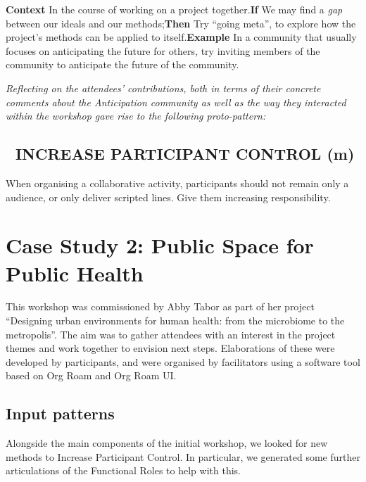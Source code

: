 \documentclass[acmlarge,timestamp]{acmart}
\newcommand{\motor}{(m)}
\begin{document}
\textbf{Context} In the course of working on a project
together.\newline \textbf{If} We may find a \textit{gap} between
our ideals and our methods;\newline \textbf{Then} Try “going
meta”, to explore how the project’s methods can be applied to
itself.\newline \textbf{Example} In a community that usually
focuses on anticipating the future for others, try inviting members of
the community to anticipate the future of the community.

\medskip

\noindent \emph{Reflecting on the attendees’ contributions, both in
terms of their concrete comments about the Anticipation community as
well as the way they interacted within the workshop gave rise to the
following proto-pattern:}

\subsection*{💎 INCREASE PARTICIPANT CONTROL {\hfill \motor}}

When organising a collaborative activity, participants should not
remain only a audience, or only deliver scripted lines.  Give them
increasing responsibility.

\clearpage

\section{Case Study 2: Public Space for Public Health}

This workshop was commissioned by Abby Tabor as part of her project
“Designing urban environments for human health: from the microbiome to
the metropolis”.  The aim was to gather attendees with an interest in
the project themes and work together to envision next
steps. Elaborations of these were developed by participants, and were
organised by facilitators using a software tool based on Org Roam and
Org Roam UI.

\subsection{Input patterns}

Alongside the main components of the initial workshop, we looked for
new methods to {\sc Increase Participant Control}.  In particular, we
generated some further articulations of the {\sc Functional Roles} to
help with this.
\end{document}
